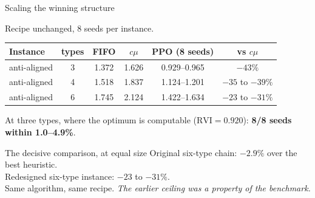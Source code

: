 \documentclass[11pt,aspectratio=169]{beamer}
\newcommand{\good}[1]{\textbf{#1}}
\begin{document}
\begin{frame}{Scaling the winning structure}

Recipe unchanged, 8 seeds per instance.

\begin{center}
\begin{tabular}{lccccc}
\toprule
Instance & types & FIFO & $c\mu$ & PPO (8 seeds) & vs $c\mu$ \\
\midrule
anti-aligned & 3 & 1.372 & 1.626 & 0.929--0.965 & \good{$-43\%$} \\
anti-aligned & 4 & 1.518 & 1.837 & 1.124--1.201 & $-35$ to $-39\%$ \\
anti-aligned & 6 & 1.745 & 2.124 & 1.422--1.634 & $-23$ to $-31\%$ \\
\bottomrule
\end{tabular}
\end{center}

\vfill
At three types, where the optimum is computable ($\mathrm{RVI} = 0.920$):
\good{8/8 seeds within 1.0--4.9\%}.

\vfill
\begin{block}{The decisive comparison, at equal size}
Original six-type chain: $-2.9\%$ over the best heuristic. \\
Redesigned six-type instance: $-23$ to $-31\%$. \\[2pt]
Same algorithm, same recipe.  \emph{The earlier ceiling was a property of the
benchmark.}
\end{block}

\end{frame}
\end{document}
